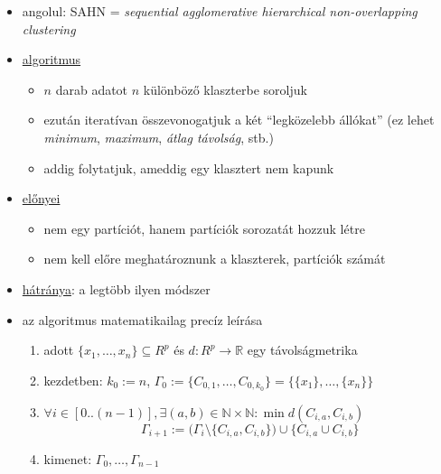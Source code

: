 \documentclass[a4paper, 11pt]{article}
\begin{document}
\begin{itemize}
	\item angolul: SAHN = \textit{sequential agglomerative hierarchical non-overlapping clustering}
	\item \underline{algoritmus}
	\begin{itemize}
		\item $n$ darab adatot $n$ különböző klaszterbe soroljuk
		\item ezután iteratívan összevonogatjuk a két ``legközelebb állókat'' (ez lehet \textit{minimum}, \textit{maximum}, \textit{átlag távolság}, stb.)
		\item addig folytatjuk, ameddig egy klasztert nem kapunk
	\end{itemize}
	\item \underline{előnyei}
	\begin{itemize}
		\item nem egy partíciót, hanem partíciók sorozatát hozzuk létre
		\item nem kell előre meghatároznunk a klaszterek, partíciók számát
	\end{itemize}
	\item \underline{hátránya}: a legtöbb ilyen módszer 
	
	\item az algoritmus matematikailag precíz leírása
	
	\begin{enumerate}[1. lépés:]
		\item adott $\{ x_1, \dots, x_n \} \subseteq R^p$ és $d : R^p \to \mathbb{R}$ egy távolságmetrika
		\item kezdetben: $k_0 := n$, $\Gamma_0 := \{ C_{0,1}, \dots, C_{0, k_0} \} = \big\{ \{x_1\}, \dots, \{x_n\} \big\}$
		\item $\forall i \in [0..(n-1)], \exists (a,b) \in \mathbb{N}\times\mathbb{N}:\min d(C_{i,a}, C_{i,b})$
		\[ \Gamma_{i+1} := \Big( \Gamma_i \setminus \{ C_{i,a}, C_{i,b} \} \Big) \cup \{ C_{i,a} \cup C_{i,b} \} \]
		\item kimenet: $\Gamma_0, \dots, \Gamma_{n-1}$
	\end{enumerate}
	

\end{itemize}
\end{document}

